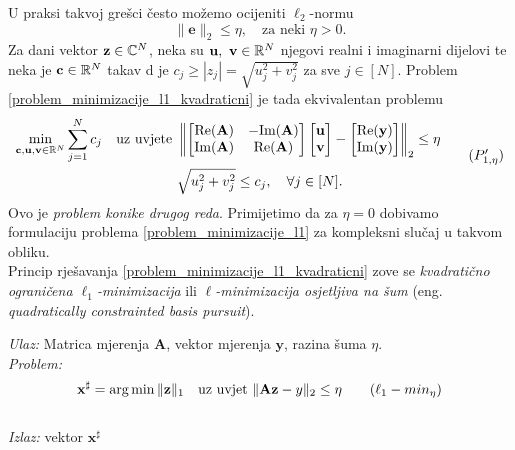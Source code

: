 \documentclass[a4paper,twoside,12pt]{memoir} %
\newcommand{\vect}[1]{\mathbf{#1}}
\renewcommand{\vec}{\vect}
\newcommand{\norm}[1]{\|{#1}\|}
\newcommand{\norms}[1]{\left\lVert#1\right\rVert}
\DeclareMathOperator*{\argmin}{arg\,min}
\renewcommand{\Re}{\text{\normalfont{Re}}}
\renewcommand{\Im}{\text{\normalfont{Im}}}
\newenvironment{alg}[1]
{
    \bigskip
    \begin{tcolorbox}[arc=0mm,boxrule=1.2pt,colframe=black,colback=white,detach title, before upper={\medskip\begin{center}\textbf{#1}\end{center}\hline\newline\medskip},frame hidden]
    \medskip
}
{
    \medskip
\end{tcolorbox}
    \bigskip
}
\begin{document}
U praksi takvoj gre\v{s}ci \v{c}esto mo\v{z}emo ocijeniti $\ell_2$-normu
\begin{equation*}
    \norm{\vec e}_2 \leq \eta, \quad \text{za neki } \eta > 0.
\end{equation*}
Za dani vektor $\vec z \in \C^N$, neka su $\vec u,\ \vec v \in \R^N$ njegovi realni i imaginarni dijelovi te neka je $\vec c \in \R^N$ takav d je $c_j \geq |z_j| = \sqrt{u_j^2+v_j^2}$ za sve $j \in [N]$. Problem \eqref{problem_minimizacije_l1_kvadraticni} je tada ekvivalentan problemu
\begin{equation}
\begin{split}
    \min_{\vec c, \vec u, \vec v \in \R^N}\sum_{j=1}^N c_j\quad \text{uz uvjete }& 
    \norms{
        \begin{bmatrix*}
            \Re(\vec A) & -\Im(\vec A) \\
            \Im(\vec A) & \Re(\vec A)
        \end{bmatrix*}
        \begin{bmatrix*}
           \vec u \\ \vec v 
        \end{bmatrix*}
        -
        \begin{bmatrix*}
            \Re(\vec y) \\ \Im(\vec y) 
    \end{bmatrix*} }_2 \leq \eta \\
    &\sqrt{u_j^2 + v_j^2} \leq c_j,\quad \forall j \in [N].
\end{split}\tag{$P_{1, \eta}'$}\label{problem_minimizacije_l1_kvadraticni_drugi_oblik}
\end{equation}
Ovo je \textit{problem konike drugog reda}. Primijetimo da za $\eta=0$ dobivamo formulaciju problema \eqref{problem_minimizacije_l1} za kompleksni slu\v{c}aj u takvom obliku.
\\\indent Princip rje\v{s}avanja \eqref{problem_minimizacije_l1_kvadraticni} zove se \textit{kvadrati\v{c}no ograni\v{c}ena $\ell_1$-minimizacija} ili \textit{$\ell$-minimizacija osjetljiva na \v{s}um} (eng. \textit{quadratically constrainted basis pursuit}).
\begin{alg}{Kvadrati\v{c}no ograni\v{c}ena $\ell_1$-minimizacija}
    \textit{Ulaz:} Matrica mjerenja $\vec A$, vektor mjerenja $\vec y$, razina \v{s}uma $\eta$. \\
    \textit{Problem:}
        \begin{equation}
            \vec x^{\sharp} = \argmin \norm{\vec z}_1 \quad \text{uz uvjet }\norm{\vec{Az}-y}_2 \leq \eta\tag{$\ell_1-min_{\eta}$}\label{algoritam_l1_minimizacija_kvadraticna}
        \end{equation} \\
        \textit{Izlaz:} vektor $\vec x^{\sharp}$
\end{alg}
\end{document}
